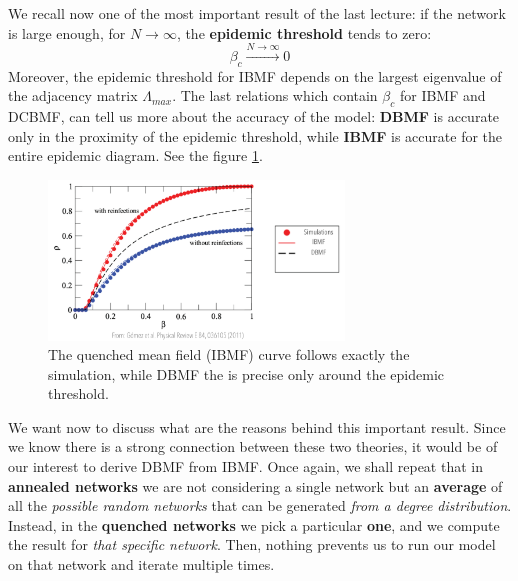 \documentclass[../main/main.tex]{subfiles}
\begin{document}
We recall now one of the most important result of the last lecture: if the network is large enough, for \( N \rightarrow \infty  \), the \textbf{epidemic threshold} tends to zero:
\begin{equation}
    \beta_c \xrightarrow{N \to \infty} 0
\end{equation}
Moreover, the epidemic threshold for IBMF depends on the largest eigenvalue of the adjacency matrix $\Lambda_{max}$.
The last relations which contain \( \beta _c \) for IBMF and DCBMF, can tell us more about the accuracy of the model: \textbf{DBMF} is accurate only in the proximity of the epidemic threshold, while \textbf{IBMF} is accurate for the entire epidemic diagram. See the figure \ref{fig:09_3}.

\begin{figure}[h!]
\centering
\includegraphics[width=0.7\textwidth]{../lessons/image/09/3.png}
\caption{\label{fig:09_3} The quenched mean field (IBMF) curve follows exactly the simulation, while DBMF the is precise only around the epidemic threshold.}
\end{figure}

We want now to discuss what are the reasons behind this important result. Since we know there is a strong connection between these two theories, it would be of our interest to derive DBMF from IBMF. Once again, we shall repeat that in \textbf{annealed networks} we are not considering a single network but an \textbf{average} of all the \textit{possible random networks} that can be generated \textit{from a degree distribution}. Instead, in the \textbf{quenched networks} we pick a particular \textbf{one}, and we compute the result for \textit{that specific network}. Then, nothing prevents us to run our model on that network and iterate multiple times.
\end{document}
